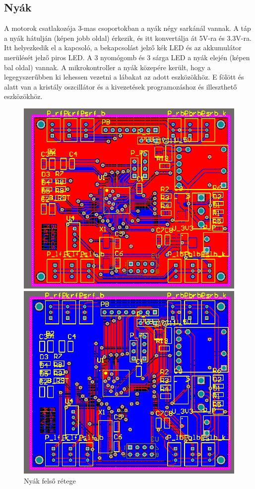 \documentclass{article}
\begin{document}
\subsection{Nyák}
A motorok csatlakozója 3-mas csoportokban a nyák négy sarkánál vannak. A táp a nyák hátulján (képen jobb oldal) érkezik, és itt konvertálja át 5V-ra és 3.3V-ra. Itt helyezkedik el a kapcsoló, a bekapcsolást jelző kék LED és az akkumulátor merülését jelző piros LED. A 3 nyomógomb és 3 sárga LED a nyák elején (képen bal oldal) vannak. A mikrokontroller a nyák közepére került, hogy a legegyszerűbben ki lehessen vezetni a lábakat az adott eszközökhöz. E fölött és alatt van a kristály oszcillátor és a kivezetések programozáshoz és illeszthető eszközökhöz.
\begin{figure}[h]
\centering
	\begin{minipage}{0.3\textwidth}
		\centering
		\includegraphics[width=\textwidth]{nyakfelso}
		\caption{Nyák felső rétege}
	\end{minipage}\hfill
	\begin{minipage}{0.3\textwidth}
		\centering
		\includegraphics[width=\textwidth]{nyakalso}

\end{minipage}
\end{figure}
\end{document}
